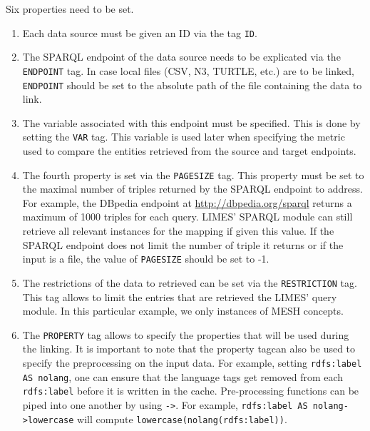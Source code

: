 \documentclass[a4paper, 11pt]{article}
\begin{document}
Six properties need to be set.
\begin{enumerate}
\item Each data source must be given an ID via the tag \texttt{ID}.
\item The SPARQL endpoint of the data source needs to be explicated via the \texttt{ENDPOINT} tag. In case local files (CSV, N3, TURTLE, etc.) are to be linked, \texttt{ENDPOINT} should be set to the absolute path of the file containing the data to link.
\item The variable associated with this endpoint must be specified. This is done by setting the \texttt{VAR} tag. This variable is used later when specifying the metric used to compare the entities retrieved from the source and target endpoints.
\item The fourth property is set via the \texttt{PAGESIZE} tag. This property must be set to the maximal number of triples returned by the SPARQL endpoint to address. For example, the DBpedia endpoint at \url{http://dbpedia.org/sparql} returns a maximum of 1000 triples for each query. LIMES' SPARQL module can still retrieve all relevant instances for the mapping if given this value. If the SPARQL endpoint does not limit the number of triple it returns or if the input is a file, the value of \texttt{PAGESIZE} should be set to -1.
\item The restrictions of the data to retrieved can be set via the \texttt{RESTRICTION} tag. This tag allows to limit the entries that are retrieved the LIMES' query module. In this particular example, we only instances of MESH concepts.
\item The \texttt{PROPERTY} tag allows to specify the properties that will be used during the linking. It is important to note that the property tagcan also be used to specify the preprocessing on the input data. For example, setting \texttt{rdfs:label AS nolang}, one can ensure that the language tags get removed from each \texttt{rdfs:label} before it is written in the cache. Pre-processing functions can be piped into one another by using \texttt{->}. For example, \texttt{rdfs:label AS nolang->lowercase} will compute \texttt{lowercase(nolang(rdfs:label))}.
\end{enumerate}
\end{document}
